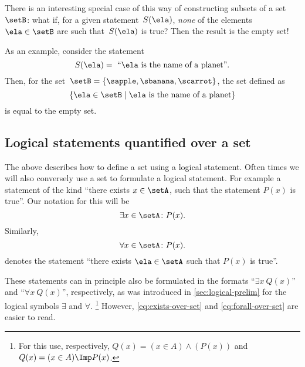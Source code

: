 There is an interesting special case of this way of constructing subsets of a set~$\setB$:
what if, for a given statement~$S(\ela)$, \emph{none} of the elements~$\ela \in \setB$ are such that~$S(\ela)$ is true?
Then the result is the empty set!

As an example, consider the statement
%
\begin{equation*}
    S(\ela) =\text{ ``} \ela \text{ is the name of a planet''}.
\end{equation*}
%
Then, for the set~$\setB = \{ \sapple, \sbanana, \scarrot \}$, the set defined as
\begin{equation*}
    \{ \ela \in \setB \mid \ela \text{ is the name of a planet} \}
\end{equation*}
is equal to the empty set.

\subsection{Logical statements quantified over a set}

The above describes how to define a set using a logical statement.
Often times we will also conversely use a set to formulate a logical statement.
For example a statement of the kind ``there exists $x \in \setA$, such that the statement $P(x)$ is true''.
Our notation for this will be
\begin{equation}\label{eq:exists-over-set}
    \exists x \in \setA \colon P(x).
\end{equation}
Similarly,
\begin{equation}\label{eq:forall-over-set}
    \forall x \in \setA \colon P(x).
\end{equation}
denotes the statement ``there exists $\ela \in \setA$ such that $P(x)$ is true''.

These statements can in principle also be formulated in the formats ``$\exists x \ Q(x)$'' and ``$\forall x \ Q(x)$'', respectively, as was introduced in \cref{sec:logical-prelim} for the logical symbols $\exists$ and $\forall$.
\footnote{For this use, respectively, $Q(x) = (x \in A) \wedge (P(x))$ and $Q(x) = (x \in A) \Imp P(x)$.}
However, \cref{eq:exists-over-set} and \cref{eq:forall-over-set} are easier to read.

